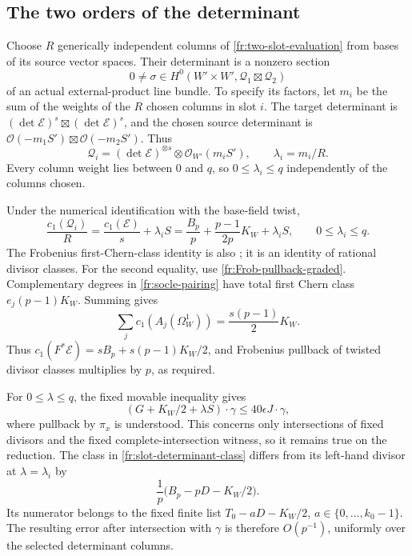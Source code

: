 \documentclass[12pt,a4paper,psamsfonts]{amsart}
\theoremstyle{definition}
\theoremstyle{plain}
\newcommand{\OO}{\mathcal O}
\begin{document}
\subsection{The two orders of the determinant}
\label{fr:determinant}

Choose $R$ generically independent columns of
\eqref{fr:two-slot-evaluation} from bases of its source vector spaces.
Their determinant is a nonzero section
\[
 0\ne\sigma\in H^0(W'\times W',\mathcal Q_1\boxtimes\mathcal Q_2)
\]
of an actual external-product line bundle. To specify its factors,
let $m_i$ be the sum of the weights of the $R$ chosen columns in
slot $i$. The target determinant is
$(\det\mathcal E)^s\boxtimes(\det\mathcal E)^s$, and the
chosen source determinant is
$\OO(-m_1S')\boxtimes\OO(-m_2S')$. Thus
\[
 \mathcal Q_i=(\det\mathcal E)^{\otimes s}
                 \otimes\OO_{W'}(m_iS'),\qquad
 \lambda_i=m_i/R.
\]
Every column weight lies between $0$ and $q$, so
$0\le\lambda_i\le q$ independently of the columns chosen.

Under the numerical identification with the base-field twist,
\begin{equation}\label{fr:slot-determinant-class}
 \frac{c_1(\mathcal Q_i)}R
 =\frac{c_1(\mathcal E)}s+\lambda_iS
 =\frac{B_p}p+\frac{p-1}{2p}K_W+\lambda_iS,
 \qquad 0\le\lambda_i\le q.
\end{equation}
The Frobenius first-Chern-class identity is also
\cite[Lemma~4.2]{Sun}; it is an identity of rational divisor classes.  For the second equality, use
\eqref{fr:Frob-pullback-graded}.  Complementary degrees in
\eqref{fr:socle-pairing} have total first Chern class
$e_j(p-1)K_W$.  Summing gives
\[
 \sum_jc_1(A_j(\Omega_W^1))=\frac{s(p-1)}2K_W.
\]
Thus $c_1(F^*\mathcal E)=sB_p+s(p-1)K_W/2$, and Frobenius pullback of
twisted divisor classes multiplies by $p$, as required.

For $0\le\lambda\le q$, the fixed movable inequality gives
\[
 (G+K_W/2+\lambda S)\cdot\gamma\le40\epsilon J\cdot\gamma,
\]
where pullback by $\pi_x$ is understood. This concerns only
intersections of fixed divisors and the fixed complete-intersection
witness, so it remains true on the reduction. The class in
\eqref{fr:slot-determinant-class} differs from its
left-hand divisor at $\lambda=\lambda_i$ by
\[
 \frac1p\bigl(B_p-pD-K_W/2\bigr).
\]
Its numerator belongs to the fixed finite list
$T_0-aD-K_W/2$, $a\in\{0,\ldots,k_0-1\}$. The resulting error after
intersection with $\gamma$ is therefore $O(p^{-1})$, uniformly
over the selected determinant columns.
\end{document}
